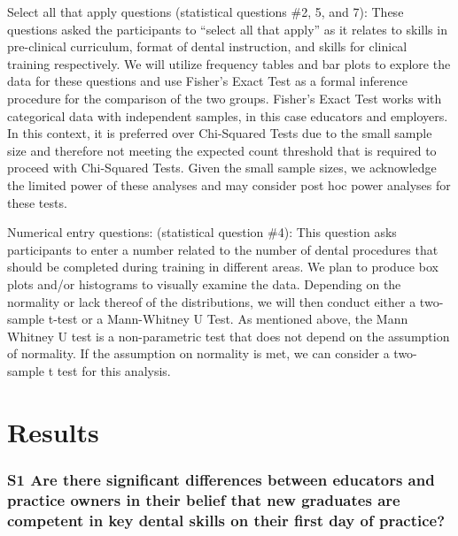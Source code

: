 \documentclass[
  11pt,
  letterpaper,
  DIV=11,
  numbers=noendperiod]{scrartcl}
\numberwithin{figure}{section}
\begin{document}
Select all that apply questions (statistical questions \#2, 5, and 7):
These questions asked the participants to ``select all that apply'' as
it relates to skills in pre-clinical curriculum, format of dental
instruction, and skills for clinical training respectively. We will
utilize frequency tables and bar plots to explore the data for these
questions and use Fisher's Exact Test as a formal inference procedure
for the comparison of the two groups. Fisher's Exact Test works with
categorical data with independent samples, in this case educators and
employers. In this context, it is preferred over Chi-Squared Tests due
to the small sample size and therefore not meeting the expected count
threshold that is required to proceed with Chi-Squared Tests. Given the
small sample sizes, we acknowledge the limited power of these analyses
and may consider post hoc power analyses for these tests.

Numerical entry questions: (statistical question \#4): This question
asks participants to enter a number related to the number of dental
procedures that should be completed during training in different areas.
We plan to produce box plots and/or histograms to visually examine the
data. Depending on the normality or lack thereof of the distributions,
we will then conduct either a two-sample t-test or a Mann-Whitney U
Test. As mentioned above, the Mann Whitney U test is a non-parametric
test that does not depend on the assumption of normality. If the
assumption on normality is met, we can consider a two-sample t test for
this analysis.

\hypertarget{results}{%
\section{Results}\label{results}}

\hypertarget{s1-are-there-significant-differences-between-educators-and-practice-owners-in-their-belief-that-new-graduates-are-competent-in-key-dental-skills-on-their-first-day-of-practice}{%
\subsubsection{S1 Are there significant differences between educators
and practice owners in their belief that new graduates are competent in
key dental skills on their first day of
practice?}\label{s1-are-there-significant-differences-between-educators-and-practice-owners-in-their-belief-that-new-graduates-are-competent-in-key-dental-skills-on-their-first-day-of-practice}}
\end{document}
